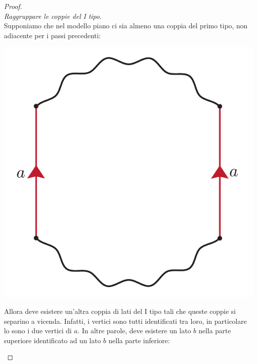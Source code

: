 \begin{proof}{}
\begin{equation*}
\end{equation*}
 \textit{Raggruppare le coppie del I tipo}.\\
Supponiamo che nel modello piano ci sia almeno una coppia del primo tipo, non adiacente per i passi precedenti:
\begin{center}
	\includegraphics[trim=0cm 0cm 0cm 0cm, clip, scale=0.35]{images/cutandpastealgorithmstep4-1.pdf}
\end{center}
Allora deve esistere un'altra coppia di lati del I tipo tali che queste coppie si separino a vicenda. Infatti, i vertici sono tutti identificati tra loro, in particolare lo sono i due vertici di $a$. In altre parole, deve esistere un lato $b$ nella parte superiore identificato ad un lato $b$ nella parte inferiore:
	\begin{center}

\end{center}
\end{proof}
